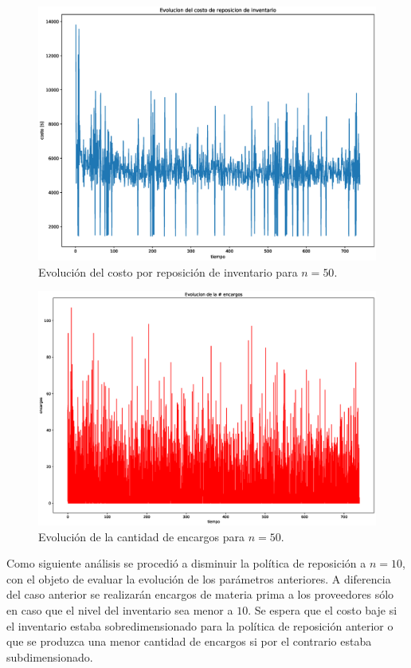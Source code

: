 \documentclass[10pt]{article}
\begin{document}
\begin{figure}[h] 
	\centering 
	\includegraphics[width=1\textwidth]{img/CostoReposicion50} 
	\caption{Evolución del costo por reposición de inventario para $n=50$.} 
	\label{fig:CostoReposicion50} 
\end{figure}

\begin{figure}[h] 
	\centering 
	\includegraphics[width=1\textwidth]{img/EvolucionEncargos50} 
	\caption{Evolución de la cantidad de encargos para $n=50$.} 
	\label{fig:EvolucionEncargos50} 
\end{figure}
\FloatBarrier

Como siguiente análisis se procedió a disminuir la política de reposición a $n=10$, con el objeto de evaluar la evolución de los parámetros anteriores. A diferencia del caso anterior se realizarán encargos de materia prima a los proveedores sólo en caso que el nivel del inventario sea menor a $10$. Se espera que el costo baje si el inventario estaba sobredimensionado para la política de reposición anterior o que se produzca una menor cantidad de encargos si por el contrario estaba subdimensionado.
\end{document}
